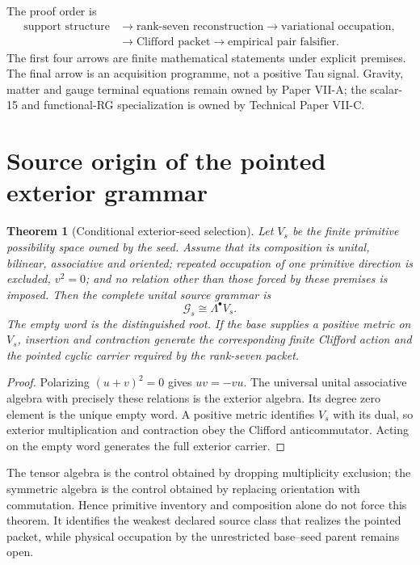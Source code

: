 \documentclass[11pt]{article}
\newtheorem{theorem}{Theorem}
\begin{document}
The proof order is
\[
\begin{aligned}
\text{support structure}&\longrightarrow\text{rank-seven reconstruction}
\longrightarrow\text{variational occupation},\\
&\longrightarrow\text{Clifford packet}
\longrightarrow\text{empirical pair falsifier}.
\end{aligned}
\]
The first four arrows are finite mathematical statements under explicit
premises. The final arrow is an acquisition programme, not a positive Tau
signal. Gravity, matter and gauge terminal equations remain owned by Paper
VII-A; the scalar-15 and functional-RG specialization is owned by Technical
Paper VII-C.



\section{Source origin of the pointed exterior grammar}

\begin{theorem}[Conditional exterior-seed selection]
Let $V_s$ be the finite primitive possibility space owned by the seed. Assume
that its composition is unital, bilinear, associative and oriented; repeated
occupation of one primitive direction is excluded, $v^2=0$; and no relation
other than those forced by these premises is imposed. Then the complete
unital source grammar is
\[
 \mathcal G_s\cong\Lambda^\bullet V_s .
\]
The empty word is the distinguished root. If the base supplies a positive
metric on $V_s$, insertion and contraction generate the corresponding finite
Clifford action and the pointed cyclic carrier required by the rank-seven
packet.
\end{theorem}
\begin{proof}
Polarizing $(u+v)^2=0$ gives $uv=-vu$. The universal unital associative
algebra with precisely these relations is the exterior algebra. Its degree
zero element is the unique empty word. A positive metric identifies
$V_s$ with its dual, so exterior multiplication and contraction obey the
Clifford anticommutator. Acting on the empty word generates the full exterior
carrier.
\end{proof}

The tensor algebra is the control obtained by dropping multiplicity exclusion;
the symmetric algebra is the control obtained by replacing orientation with
commutation. Hence primitive inventory and composition alone do not force this
theorem. It identifies the weakest declared source class that realizes the
pointed packet, while physical occupation by the unrestricted base--seed
parent remains open.
\end{document}
